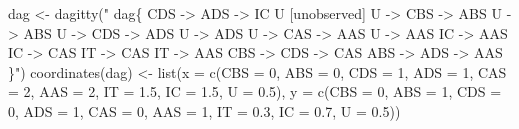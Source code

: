 \documentclass[
  10pt,
  dvipsnames, enabledeprecatedfontcommands]{scrartcl}
\newenvironment{Shaded}{\begin{snugshade}}{\end{snugshade}}
\newcommand{\AttributeTok}[1]{\textcolor[rgb]{0.77,0.63,0.00}{#1}}
\newcommand{\DecValTok}[1]{\textcolor[rgb]{0.00,0.00,0.81}{#1}}
\newcommand{\FloatTok}[1]{\textcolor[rgb]{0.00,0.00,0.81}{#1}}
\newcommand{\FunctionTok}[1]{\textcolor[rgb]{0.00,0.00,0.00}{#1}}
\newcommand{\NormalTok}[1]{#1}
\newcommand{\OtherTok}[1]{\textcolor[rgb]{0.56,0.35,0.01}{#1}}
\newcommand{\StringTok}[1]{\textcolor[rgb]{0.31,0.60,0.02}{#1}}
\begin{document}
\vspace{1mm}
\footnotesize

\begin{Shaded}
\begin{Highlighting}[]
\NormalTok{dag }\OtherTok{\textless{}{-}} \FunctionTok{dagitty}\NormalTok{(}\StringTok{"}
\StringTok{  dag\{}
\StringTok{  CDS {-}\textgreater{} ADS {-}\textgreater{} IC  }
\StringTok{               U [unobserved]   }
\StringTok{               U {-}\textgreater{} CBS {-}\textgreater{} ABS  }
\StringTok{               U {-}\textgreater{} ABS        }
\StringTok{               U {-}\textgreater{} CDS {-}\textgreater{} ADS  }
\StringTok{               U {-}\textgreater{} ADS         }
\StringTok{               U {-}\textgreater{} CAS {-}\textgreater{} AAS    }
\StringTok{               U {-}\textgreater{} AAS                        }
\StringTok{               IC {-}\textgreater{} AAS        }
\StringTok{               IC {-}\textgreater{} CAS        }
\StringTok{               IT {-}\textgreater{} CAS        }
\StringTok{               IT {-}\textgreater{} AAS}
\StringTok{               CBS {-}\textgreater{} CDS {-}\textgreater{} CAS}
\StringTok{               ABS {-}\textgreater{} ADS {-}\textgreater{} AAS}
\StringTok{               \}"}\NormalTok{)}
\FunctionTok{coordinates}\NormalTok{(dag) }\OtherTok{\textless{}{-}} \FunctionTok{list}\NormalTok{(}\AttributeTok{x =} \FunctionTok{c}\NormalTok{(}\AttributeTok{CBS =} \DecValTok{0}\NormalTok{, }\AttributeTok{ABS =} \DecValTok{0}\NormalTok{, }\AttributeTok{CDS =} \DecValTok{1}\NormalTok{, }\AttributeTok{ADS =} \DecValTok{1}\NormalTok{, }\AttributeTok{CAS =} \DecValTok{2}\NormalTok{,}
    \AttributeTok{AAS =} \DecValTok{2}\NormalTok{, }\AttributeTok{IT =} \FloatTok{1.5}\NormalTok{, }\AttributeTok{IC =} \FloatTok{1.5}\NormalTok{, }\AttributeTok{U =} \FloatTok{0.5}\NormalTok{), }\AttributeTok{y =} \FunctionTok{c}\NormalTok{(}\AttributeTok{CBS =} \DecValTok{0}\NormalTok{, }\AttributeTok{ABS =} \DecValTok{1}\NormalTok{, }\AttributeTok{CDS =} \DecValTok{0}\NormalTok{,}
    \AttributeTok{ADS =} \DecValTok{1}\NormalTok{, }\AttributeTok{CAS =} \DecValTok{0}\NormalTok{, }\AttributeTok{AAS =} \DecValTok{1}\NormalTok{, }\AttributeTok{IT =} \FloatTok{0.3}\NormalTok{, }\AttributeTok{IC =} \FloatTok{0.7}\NormalTok{, }\AttributeTok{U =} \FloatTok{0.5}\NormalTok{))}
\end{Highlighting}
\end{Shaded}

\normalsize
\end{document}
